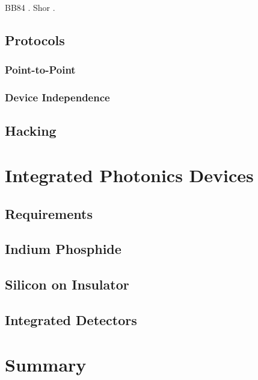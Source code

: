 BB84 \cite{BB84}. Shor \cite{shor1994}.

\subsection{Protocols}

\subsubsection*{Point-to-Point}

\subsubsection*{Device Independence}

\subsection{Hacking}

\section{Integrated Photonics Devices}

\subsection{Requirements}

\subsection{Indium Phosphide}

\subsection{Silicon on Insulator}

\subsection{Integrated Detectors}

\section{Summary}


